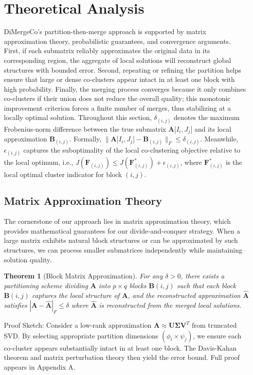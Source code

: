 \documentclass[journal]{IEEEtran}
\newtheorem{theorem}{Theorem}
\begin{document}
\section{Theoretical Analysis}
\label{sec:theoretical_foundations}
DiMergeCo's partition-then-merge approach is supported by matrix approximation theory, probabilistic guarantees, and convergence arguments. First, if each submatrix reliably approximates the original data in its corresponding region, the aggregate of local solutions will reconstruct global structures with bounded error. Second, repeating or refining the partition helps ensure that large or dense co-clusters appear intact in at least one block with high probability. Finally, the merging process converges because it only combines co-clusters if their union does not reduce the overall quality; this monotonic improvement criterion forces a finite number of merges, thus stabilizing at a locally optimal solution.
Throughout this section, $\delta_{(i,j)}$ denotes the maximum Frobenius-norm difference between the true submatrix $\mathbf{A}\lbrack I_i,J_j\rbrack $ and its local approximation $\mathbf{B}_{(i,j)}$. Formally, $\|\mathbf{A}\lbrack I_i, J_j\rbrack - \mathbf{B}_{(i,j)}\|_F \leq \delta_{(i,j)}$. Meanwhile, $\epsilon_{(i,j)}$ captures the suboptimality of the local co-clustering objective relative to the local optimum, i.e., $J(\mathbf{F}_{(i,j)}) \leq J(\mathbf{F}_{(i,j)}^*) + \epsilon_{(i,j)}$, where $\mathbf{F}_{(i,j)}^*$ is the local optimal cluster indicator for block $(i,j)$.

\subsection{Matrix Approximation Theory}
The cornerstone of our approach lies in matrix approximation theory, which provides mathematical guarantees for our divide-and-conquer strategy. When a large matrix exhibits natural block structures or can be approximated by such structures, we can process smaller submatrices independently while maintaining solution quality.
\begin{theorem}[Block Matrix Approximation]
    For any $\delta > 0$, there exists a partitioning scheme dividing $\mathbf{A}$ into $p \times q$ blocks ${\mathbf{B}{(i,j)}}$ such that each block $\mathbf{B}{(i,j)}$ captures the local structure of $\mathbf{A}$, and the reconstructed approximation $\hat{\mathbf{A}}$ satisfies $|\mathbf{A} - \hat{\mathbf{A}}|_F \le \delta$ where $\hat{\mathbf{A}}$ is reconstructed from the merged local solutions.
\end{theorem}
Proof Sketch: Consider a low-rank approximation $\mathbf{A} \approx \mathbf{U}\mathbf{\Sigma}\mathbf{V}^T$ from truncated SVD. By selecting appropriate partition dimensions $(\phi_i \times \psi_j)$, we ensure each co-cluster appears substantially intact in at least one block. The Davis-Kahan theorem and matrix perturbation theory then yield the error bound. Full proof appears in Appendix A.
\end{document}
